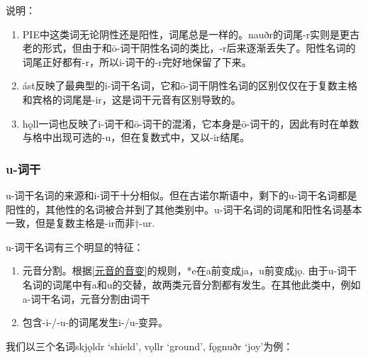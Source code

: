 说明：

\begin{enumerate}
\def\labelenumi{\arabic{enumi})}
\item
  PIE中这类词无论阴性还是阳性，词尾总是一样的。nauðr的词尾-r实则是更古老的形式，但由于和ō-词干阴性名词的类比，-r后来逐渐丢失了。阳性名词的词尾正好都有-r，所以i-词干的-r完好地保留了下来。
\item
  ást反映了最典型的i-词干名词，它和ō-词干阴性名词的区别仅仅在于复数主格和宾格的词尾是-ir，这是词干元音有区别导致的。
\item
  hǫll一词也反映了i-词干和ō-词干的混淆，它本身是ō-词干的，因此有时在单数与格中出现可选的-u，但在复数式中，又以-ir结尾。
\end{enumerate}

\subsubsection{u-词干}\label{u-词干}

u-词干名词的来源和i-词干十分相似。但在古诺尔斯语中，剩下的u-词干名词都是阳性的，其他性的名词被合并到了其他类别中。u-词干名词的词尾和阳性名词基本一致，但是复数主格是-ir而非†-ur.

u-词干名词有三个明显的特征：

\begin{enumerate}
\def\labelenumi{\arabic{enumi})}
\item
  元音分割。根据\ref{元音的音变}的规则，*e在a前变成ja，u前变成jǫ.
  由于u-词干名词的词尾中有a和u的交替，故两类元音分割都有发生。在其他此类中，例如a-词干名词，元音分割由词干
\item
  包含-i-/-u-的词尾发生i-/u-变异。
\end{enumerate}

我们以三个名词skjǫldr `shield', vǫllr `ground', fǫgnuðr `joy'为例：

